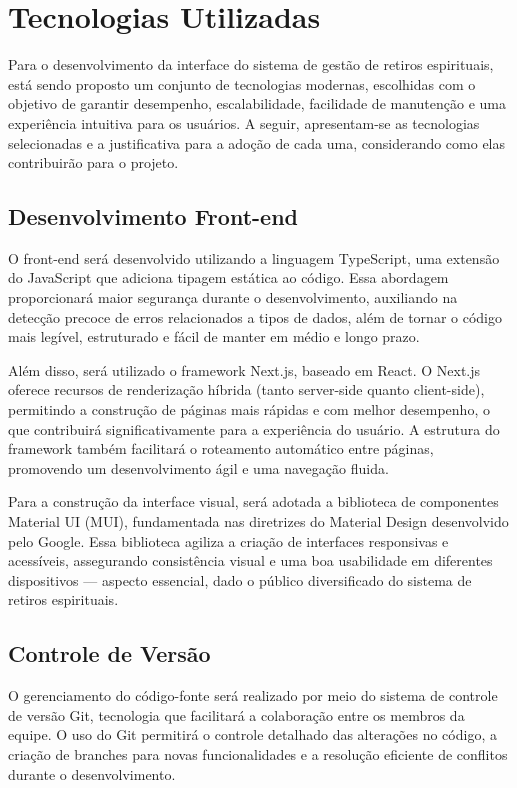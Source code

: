 \section{Tecnologias Utilizadas}

Para o desenvolvimento da interface do sistema de gestão de retiros espirituais, está sendo proposto um conjunto de tecnologias modernas, escolhidas com o objetivo de garantir desempenho, escalabilidade, facilidade de manutenção e uma experiência intuitiva para os usuários. A seguir, apresentam-se as tecnologias selecionadas e a justificativa para a adoção de cada uma, considerando como elas contribuirão para o projeto.

\subsection{Desenvolvimento Front-end}

O front-end será desenvolvido utilizando a linguagem TypeScript, uma extensão do JavaScript que adiciona tipagem estática ao código. Essa abordagem proporcionará maior segurança durante o desenvolvimento, auxiliando na detecção precoce de erros relacionados a tipos de dados, além de tornar o código mais legível, estruturado e fácil de manter em médio e longo prazo.

Além disso, será utilizado o framework Next.js, baseado em React. O Next.js oferece recursos de renderização híbrida (tanto server-side quanto client-side), permitindo a construção de páginas mais rápidas e com melhor desempenho, o que contribuirá significativamente para a experiência do usuário. A estrutura do framework também facilitará o roteamento automático entre páginas, promovendo um desenvolvimento ágil e uma navegação fluida.

Para a construção da interface visual, será adotada a biblioteca de componentes Material UI (MUI), fundamentada nas diretrizes do Material Design desenvolvido pelo Google. Essa biblioteca agiliza a criação de interfaces responsivas e acessíveis, assegurando consistência visual e uma boa usabilidade em diferentes dispositivos — aspecto essencial, dado o público diversificado do sistema de retiros espirituais.

\subsection{Controle de Versão}

O gerenciamento do código-fonte será realizado por meio do sistema de controle de versão Git, tecnologia que facilitará a colaboração entre os membros da equipe. O uso do Git permitirá o controle detalhado das alterações no código, a criação de branches para novas funcionalidades e a resolução eficiente de conflitos durante o desenvolvimento.

